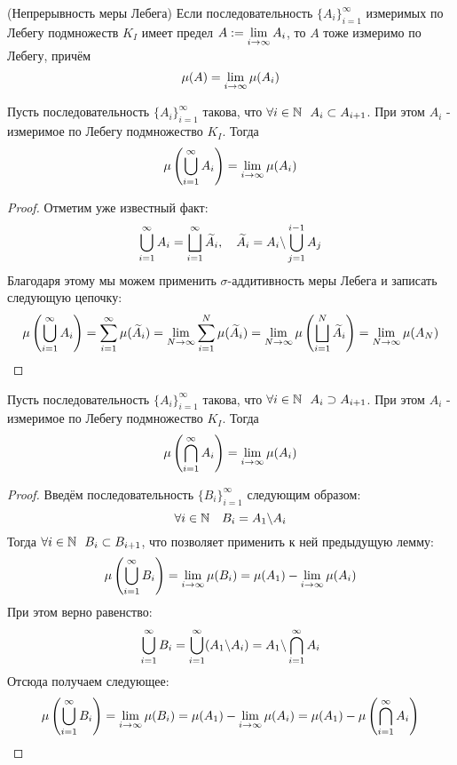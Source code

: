 \begin{theorem} (Непрерывность меры Лебега) \label{4lemth}
	Если последовательность $\{A_i\}_{i = 1}^\infty$ измеримых по Лебегу подмножеств $K_I$ имеет предел $A := \lim\limits_{i \to \infty} A_i$, то $A$ тоже измеримо по Лебегу, причём
	\[
		\mu(A) = \lim\limits_{i \to \infty} \mu(A_i)
	\]
\end{theorem}

\begin{lemma}
	Пусть последовательность $\{A_i\}_{i = 1}^\infty$ такова, что $\forall i \in \mathbb{N}\ \ A_i \subset A_{i + 1}$. При этом $A_i$ - измеримое по Лебегу подмножество $K_I$. Тогда
	\[
		\mu\left(\bigcup_{i = 1}^\infty A_i\right) = \lim\limits_{i \to \infty} \mu(A_i)
	\]
\end{lemma}

\begin{proof}
	Отметим уже известный факт:
	\[
		\bigcup_{i = 1}^\infty A_i = \bigsqcup_{i = 1}^\infty \widetilde{A}_i, \quad \widetilde{A}_i = A_i \backslash \bigcup_{j = 1}^{i - 1} A_j
	\]
	Благодаря этому мы можем применить $\sigma$-аддитивность меры Лебега и записать следующую цепочку:
	\[
		\mu\left(\bigcup_{i = 1}^\infty A_i\right) = \sum_{i = 1}^\infty \mu(\widetilde{A}_i) = \lim\limits_{N \to \infty} \sum_{i = 1}^N \mu(\widetilde{A}_i) = \lim\limits_{N \to \infty} \mu\left(\bigsqcup_{i = 1}^N \widetilde{A}_i\right) = \lim\limits_{N \to \infty} \mu(A_N)
	\]
\end{proof}

\begin{lemma} \label{justLemma}
	Пусть последовательность $\{A_i\}_{i = 1}^\infty$ такова, что $\forall i \in \mathbb{N}\ \ A_i \supset A_{i + 1}$. При этом $A_i$ - измеримое по Лебегу подмножество $K_I$. Тогда
	\[
		\mu\left(\bigcap_{i = 1}^\infty A_i\right) = \lim\limits_{i \to \infty} \mu(A_i)
	\]
\end{lemma}

\begin{proof}
	Введём последовательность $\{B_i\}_{i = 1}^\infty$ следующим образом:
	\[
		\forall i \in \mathbb{N} \quad B_i = A_1 \backslash A_i
	\]
	Тогда $\forall i \in \mathbb{N}\ \ B_i \subset B_{i + 1}$, что позволяет применить к ней предыдущую лемму:
	\[
		\mu\left(\bigcup_{i = 1}^\infty B_i\right) = \lim\limits_{i \to \infty} \mu(B_i) = \mu(A_1) - \lim\limits_{i \to \infty} \mu(A_i)
	\]
	При этом верно равенство:
	\[
		\bigcup_{i = 1}^\infty B_i = \bigcup_{i = 1}^\infty (A_1 \backslash A_i) = A_1 \backslash \bigcap_{i = 1}^\infty A_i
	\]
	Отсюда получаем следующее:
	\[
		\mu\left(\bigcup_{i = 1}^\infty B_i\right) = \lim\limits_{i \to \infty} \mu(B_i) = \mu(A_1) - \lim\limits_{i \to \infty} \mu(A_i) = \mu(A_1) - \mu\left(\bigcap_{i = 1}^\infty A_i\right)
	\]
\end{proof}


